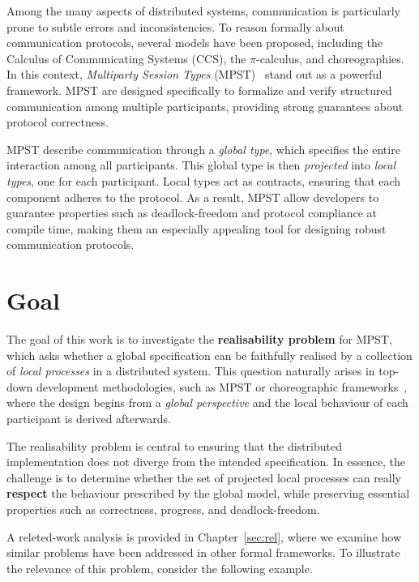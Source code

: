 Among the many aspects of distributed systems, communication is particularly 
prone to subtle errors and inconsistencies. To reason formally about 
communication protocols, several models have been proposed, including the 
Calculus of Communicating Systems (CCS), the $\pi$-calculus, and choreographies. 
In this context, \textit{Multiparty Session Types} (MPST)~\cite{honda2008multiparty} 
stand out as a powerful framework. MPST are designed specifically to formalize 
and verify structured communication among multiple participants, providing 
strong guarantees about protocol correctness.  

MPST describe communication through a \emph{global type}, which specifies 
the entire interaction among all participants. This global type is then 
\emph{projected} into \emph{local types}, one for each participant. Local 
types act as contracts, ensuring that each component adheres to the protocol. 
As a result, MPST allow developers to guarantee properties such as 
deadlock-freedom and protocol compliance at compile time, making them an 
especially appealing tool for designing robust communication protocols.

\section{Goal}
The goal of this work is to investigate the \textbf{realisability
problem} for MPST, which asks whether a global specification can be
faithfully realised by a collection of \textit{local processes} in a
distributed system. This question naturally arises in top-down
development methodologies, such as MPST or choreographic
frameworks~\cite{montesi2014choreographic}, where the design begins
from a \emph{global perspective} and the local behaviour of each
participant is derived afterwards.

The realisability problem is central to ensuring that the
distributed implementation does not diverge from the intended
specification. In essence, the challenge is to determine whether the
set of projected local processes can really \textbf{respect} the
behaviour prescribed by the global model, while preserving essential
properties such as correctness, progress, and deadlock-freedom. 

A releted-work analysis is provided in
Chapter~\ref{sec:rel}, where we examine how similar problems have been
addressed in other formal frameworks.
To illustrate the relevance of this problem, consider the following
example.

\bigskip

